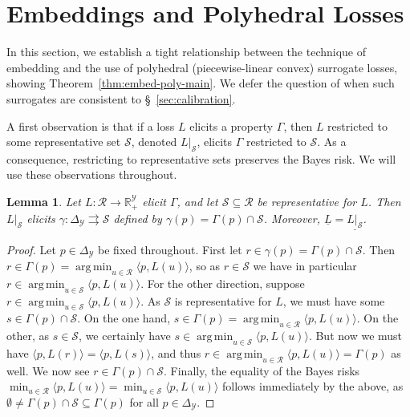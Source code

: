 \documentclass[11pt]{article}
\newcommand{\reals}{\mathbb{R}}
\newcommand{\simplex}{\Delta_\Y}
\newcommand{\R}{\mathcal{R}}
\newcommand{\Sc}{\mathcal{S}}
\newcommand{\Y}{\mathcal{Y}}
\newcommand{\risk}[1]{\underline{#1}}
\newcommand{\inprod}[2]{\langle #1, #2 \rangle}%
\newcommand{\toto}{\rightrightarrows}
\DeclareMathOperator*{\argmin}{arg\,min}
\newtheorem{lemma}{Lemma}
\begin{document}
\section{Embeddings and Polyhedral Losses}
\label{sec:poly-loss-embed}

In this section, we establish a tight relationship between the technique of embedding and the use of polyhedral (piecewise-linear convex) surrogate losses, showing Theorem~\ref{thm:embed-poly-main}.
We defer the question of when such surrogates are consistent to \S~\ref{sec:calibration}. 

A first observation is that if a loss $L$ elicits a property $\Gamma$, then $L$ restricted to some representative set $\Sc$, denoted $L|_\Sc$, elicits $\Gamma$ restricted to $\Sc$.
As a consequence, restricting to representative sets preserves the Bayes risk.
We will use these observations throughout.
\begin{lemma}\label{lem:loss-restrict}
  Let $L:\R\to\reals^\Y_+$ elicit $\Gamma$, and let $\Sc\subseteq\R$ be representative for $L$.
  Then $L|_\Sc$ elicits $\gamma:\simplex\toto\Sc$ defined by $\gamma(p) = \Gamma(p)\cap \Sc$.
  Moreover, $\risk{L}=\risk{L|_\Sc}$.
\end{lemma}
\begin{proof}
  Let $p\in\simplex$ be fixed throughout.
  First let $r \in \gamma(p) = \Gamma(p) \cap \Sc$.
  Then $r \in \Gamma(p) = \argmin_{u\in\R} \inprod{p}{L(u)}$, so as $r\in\Sc$ we have in particular $r \in \argmin_{u\in\Sc} \inprod{p}{L(u)}$.
  For the other direction, suppose $r \in \argmin_{u\in\Sc} \inprod{p}{L(u)}$.
  As $\Sc$ is representative for $L$, we must have some $s \in \Gamma(p) \cap \Sc$.
  On the one hand, $s\in\Gamma(p) = \argmin_{u\in\R} \inprod{p}{L(u)}$.
  On the other, as $s \in \Sc$, we certainly have $s \in \argmin_{u\in\Sc} \inprod{p}{L(u)}$.
  But now we must have $\inprod{p}{L(r)} = \inprod{p}{L(s)}$, and thus $r \in \argmin_{u\in\R} \inprod{p}{L(u)} = \Gamma(p)$ as well.
  We now see $r \in \Gamma(p) \cap \Sc$.
  Finally, the equality of the Bayes risks $\min_{u\in\R} \inprod{p}{L(u)} = \min_{u\in\Sc} \inprod{p}{L(u)}$ follows immediately by the above, as $\emptyset \neq \Gamma(p)\cap\Sc \subseteq \Gamma(p)$ for all $p\in\simplex$.
\end{proof}
\end{document}
